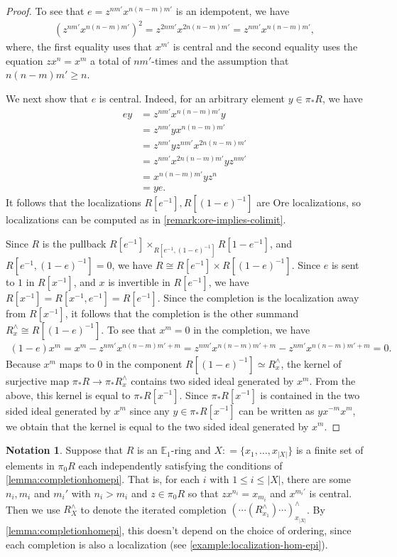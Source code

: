 \documentclass[12 pt]{amsart}
\theoremstyle{plain}
\theoremstyle{definition}
\newtheorem{notation}[theorem]{Notation}
\theoremstyle{remark}
\numberwithin{equation}{section}
\newcommand\EE{\mathbb{E}}
\begin{document}
\begin{proof}
	To see that $e=z^{nm'}x^{n(n-m)m'}$ is an idempotent, we have
	\begin{align*}
	(z^{nm'}x^{n(n-m)m'})^2=z^{2nm'}x^{2n(n-m)m'}=z^{nm'}x^{n(n-m)m'},
	\end{align*}
	where, the first equality uses that $x^{m'}$ is central and the second
	equality uses the equation $zx^n=x^m$ a total of $nm'$-times and the
	assumption that $n(n-m)m'\geq n$.
	
	We next show that $e$ is central. Indeed, for an arbitrary element $y \in \pi_*R$, we have 
	\begin{align*}
		ey&=z^{nm'}x^{n(n-m)m'}y \\
		&=z^{nm'}yx^{n(n-m)m'} \\
		&=z^{nm'}yz^{nm'}x^{2n(n-m)m'}\\
		&=z^{nm'}x^{2n(n-m)m'}yz^{nm'}\\
		&=x^{n(n-m)m'}yz^n\\
		&=ye.
	\end{align*}
	It follows that the localizations $R[e^{-1}],R[(1-e)^{-1}]$ are Ore localizations, so localizations can be computed as in \autoref{remark:ore-implies-colimit}.
	
	Since $R$ is the pullback
	$R[e^{-1}]\times_{R[e^{-1},(1-e)^{-1}]}R[1-e^{-1}]$, and
	$R[e^{-1},(1-e)^{-1}]=0$, we have $R \cong R[e^{-1}]\times R[(1-e)^{-1}]$.
	Since $e$ is sent to $1$ in $R[x^{-1}]$, and $x$ is invertible in
	$R[e^{-1}]$, we have $R[x^{-1}]=R[x^{-1},e^{-1}]=R[e^{-1}]$. Since the
	completion is the localization away from $R[x^{-1}]$, it follows that
	the completion is the other summand $R^{\wedge}_x \cong R[(1-e)^{-1}]$. To see that $x^m=0$ in the completion, we have 
	\begin{align*}
	(1-e)x^m=x^m-z^{nm'}x^{n(n-m)m'+m}=z^{nm'}x^{n(n-m)m'+m}-z^{nm'}x^{n(n-m)m'+m}=0.
	\end{align*}
	Because $x^m$ maps to $0$ in the component $R[(1-e)^{-1}] \simeq
	R^\wedge_x$, the kernel of surjective map $\pi_*R \to \pi_*R^{\wedge}_x$
	contains two sided ideal generated by $x^m$.
	From the above, this kernel is equal to 
	$\pi_*R[x^{-1}]$.
	Since $\pi_*R[x^{-1}]$ is contained in the two sided ideal generated by
	$x^m$ since any $y \in \pi_*R[x^{-1}]$ can be written as $yx^{-m} x^m$, 
	we obtain that the kernel is equal to the two sided ideal generated by
	$x^m$.
	\end{proof}

\begin{notation}\label{notation:completioncommute}
	Suppose that $R$ is an $\EE_1$-ring and $X: = \{x_1, \ldots,
	x_{|X|}\}$ is a finite set of elements
	in $\pi_0R$ each independently satisfying the conditions of \autoref{lemma:completionhomepi}.
	That is, for each $i$ with $1 \leq i \leq |X|$, there are some $n_i,
	m_i$ and $m_i'$ with $n_i > m_i$ and $z \in \pi_0 R$ so that $zx^{n_i} = x_{m_i}$
	and $x^{m_i'}$ is central.
	Then we use $R^{\wedge}_X$ to denote the iterated completion $(\cdots
	(R^{\wedge}_{x_1})\cdots)^{\wedge}_{x_{|X|}}$. By \autoref{lemma:completionhomepi}, this doesn't depend on the choice of ordering, since each completion is also a localization (see \autoref{example:localization-hom-epi}).
\end{notation}
\end{document}
